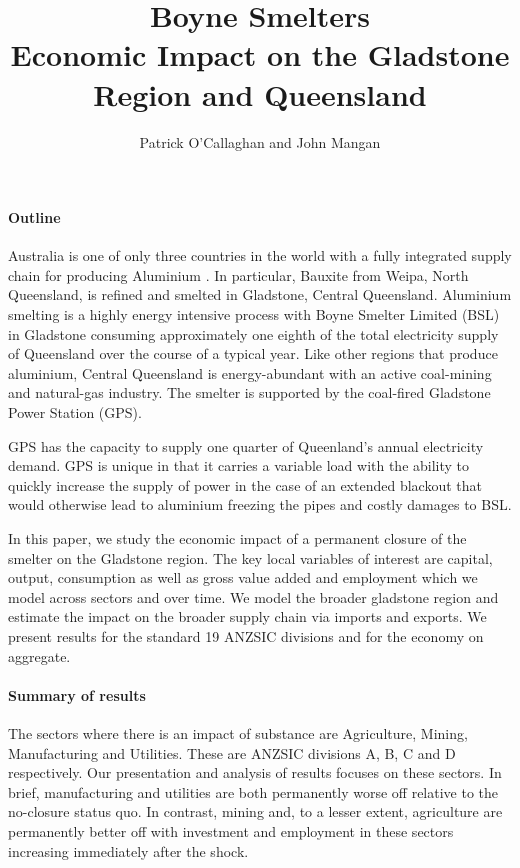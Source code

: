 \documentclass[12pt,a4paper]{article}
\title{Boyne Smelters\\\vskip5pt
  \large{Economic Impact on the
  Gladstone Region and Queensland}}
\author{\small Patrick O’Callaghan and John Mangan}
\begin{document}
\maketitle


\paragraph{Outline} Australia is one of only three countries in the world with
a fully integrated supply chain for producing Aluminium
\cite{GN-Aluminium-smelters}. In particular, Bauxite from Weipa, North
Queensland, is refined and smelted in Gladstone, Central Queensland.  Aluminium
smelting is a highly energy intensive process with Boyne Smelter Limited (BSL)
in Gladstone consuming approximately one eighth of the total electricity supply
of Queensland over the course of a typical year. Like other regions that
produce aluminium, Central Queensland is energy-abundant with an active
coal-mining and natural-gas industry. The smelter is supported by the
coal-fired Gladstone Power Station (GPS). 

GPS has the capacity to supply one quarter of Queenland's annual electricity
demand. GPS is unique in that it carries a variable load with the ability to
quickly increase the supply of power in the case of an extended blackout that
would otherwise lead to aluminium freezing the pipes and costly damages to BSL.

In this paper, we study the economic impact of a permanent closure of the
smelter on the Gladstone region. The key local variables of interest are
capital, output, consumption as well as gross value added and employment which
we model across sectors and over time. We model the broader gladstone region
and estimate the impact on the broader supply chain via imports and exports. We
present results for the standard 19 ANZSIC divisions and for the economy on
aggregate.


\paragraph{Summary of results} The sectors where there is an impact of
substance are Agriculture, Mining, Manufacturing and Utilities. These are
ANZSIC divisions A, B, C and D respectively. Our presentation and analysis of
results focuses on these sectors.  In brief, manufacturing and utilities are
both permanently worse off relative to the no-closure status quo.  In contrast,
mining and, to a lesser extent, agriculture are permanently better off with
investment and employment in these sectors increasing immediately after the
shock.
\end{document}
